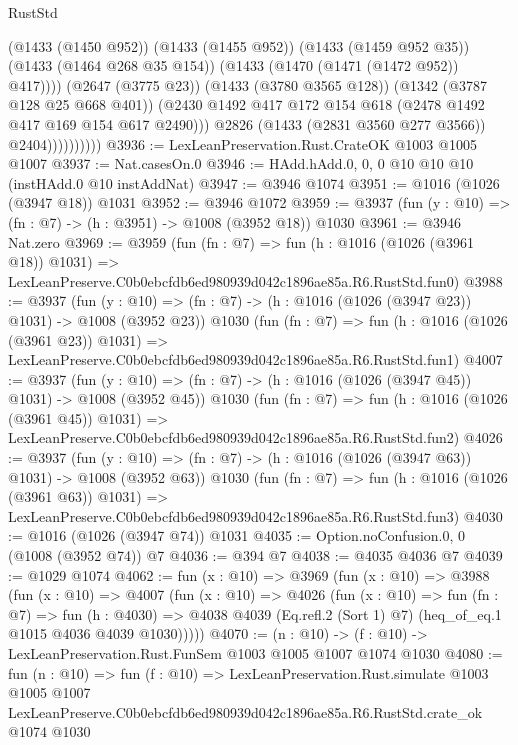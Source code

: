 \begin{lexlean}{RustStd}
\begin{coremodule}
                              (@1433 (@1450 @952))
                              (@1433 (@1455 @952))
                              (@1433 (@1459 @952 @35))
                              (@1433 (@1464 @268 @35 @154))
                              (@1433 (@1470 (@1471 (@1472 @952)) @417))))
                          (@2647 (@3775 @23))
                          (@1433 (@3780 @3565 @128))
                          (@1342 (@3787 @128 @25 @668 @401))
                          (@2430 @1492 @417 @172 @154 @618 (@2478 @1492 @417 @169 @154 @617 @2490)))
                        @2826
                        (@1433 (@2831 @3560 @277 @3566))
                        @2404))))))))))
@3936 := LexLeanPreservation.Rust.CrateOK @1003 @1005 @1007
@3937 := Nat.casesOn.{0}
@3946 := HAdd.hAdd.{0, 0, 0} @10 @10 @10 (instHAdd.{0} @10 instAddNat)
@3947 := @3946 @1074
@3951 := @1016 (@1026 (@3947 @18)) @1031
@3952 := @3946 @1072
@3959 := @3937 (fun (y : @10) => (fn : @7) -> (h : @3951) -> @1008 (@3952 @18)) @1030
@3961 := @3946 Nat.zero
@3969 := @3959
    (fun (fn : @7) =>
    fun (h : @1016 (@1026 (@3961 @18)) @1031) =>
    LexLeanPreserve.C0b0ebcfdb6ed980939d042c1896ae85a.R6.RustStd.fun0)
@3988 := @3937
    (fun (y : @10) => (fn : @7) -> (h : @1016 (@1026 (@3947 @23)) @1031) -> @1008 (@3952 @23))
    @1030
    (fun (fn : @7) =>
    fun (h : @1016 (@1026 (@3961 @23)) @1031) =>
    LexLeanPreserve.C0b0ebcfdb6ed980939d042c1896ae85a.R6.RustStd.fun1)
@4007 := @3937
    (fun (y : @10) => (fn : @7) -> (h : @1016 (@1026 (@3947 @45)) @1031) -> @1008 (@3952 @45))
    @1030
    (fun (fn : @7) =>
    fun (h : @1016 (@1026 (@3961 @45)) @1031) =>
    LexLeanPreserve.C0b0ebcfdb6ed980939d042c1896ae85a.R6.RustStd.fun2)
@4026 := @3937
    (fun (y : @10) => (fn : @7) -> (h : @1016 (@1026 (@3947 @63)) @1031) -> @1008 (@3952 @63))
    @1030
    (fun (fn : @7) =>
    fun (h : @1016 (@1026 (@3961 @63)) @1031) =>
    LexLeanPreserve.C0b0ebcfdb6ed980939d042c1896ae85a.R6.RustStd.fun3)
@4030 := @1016 (@1026 (@3947 @74)) @1031
@4035 := Option.noConfusion.{0, 0} (@1008 (@3952 @74)) @7
@4036 := @394 @7
@4038 := @4035 @4036 @7
@4039 := @1029 @1074
@4062 := fun (x : @10) =>
  @3969
    (fun (x : @10) =>
    @3988
      (fun (x : @10) =>
      @4007
        (fun (x : @10) =>
        @4026
          (fun (x : @10) =>
          fun (fn : @7) =>
          fun (h : @4030) =>
          @4038 @4039 (Eq.refl.{2} (Sort 1) @7) (heq_of_eq.{1} @1015 @4036 @4039 @1030)))))
@4070 := (n : @10) -> (f : @10) -> LexLeanPreservation.Rust.FunSem @1003 @1005 @1007 @1074 @1030
@4080 := fun (n : @10) =>
  fun (f : @10) =>
  LexLeanPreservation.Rust.simulate
    @1003
    @1005
    @1007
    LexLeanPreserve.C0b0ebcfdb6ed980939d042c1896ae85a.R6.RustStd.crate_ok
    @1074
    @1030
\end{coremodule}
\end{lexlean}
